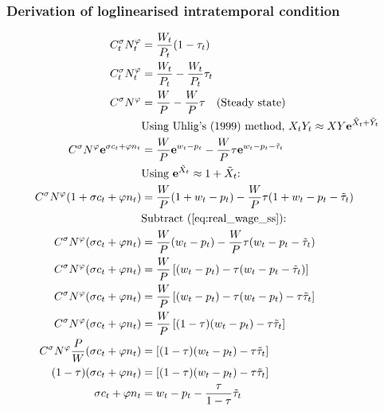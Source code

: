 \subsubsection{Derivation of loglinearised intratemporal condition}
\begin{align}
    C_t^\sigma N_t^\varphi &= \frac{W_t}{P_t}(1-\tau_t) \\
    C_t^\sigma N_t^\varphi &= \frac{W_t}{P_t} - \frac{W_t}{P_t}\tau_t \\
    C^\sigma N^\varphi &= \frac{W}{P} - \frac{W}{P}\tau \label{eq:real_wage_ss} \quad \text{(Steady state)}\\
    &\text{Using Uhlig's (1999) method, $X_tY_t \approx XY\mathbf{e}^{\tilde{X}_t + \tilde{Y}_t}$}\nonumber\\
    C^\sigma N^\varphi\mathbf{e}^{\sigma c_t + \varphi n_t} &= \frac{W}{P}\mathbf{e}^{w_t - p_t} - \frac{W}{P}\tau \mathbf{e}^{w_t - p_t - \tilde{\tau}_t}\\
    &\text{Using $\mathbf{e}^{\tilde{X}_t} \approx 1 + {\tilde{X}_t}$: }\nonumber\\
    C^\sigma N^\varphi({1+\sigma c_t + \varphi n_t}) &= \frac{W}{P}({1+ w_t - p_t}) - \frac{W}{P}\tau ({1+ w_t - p_t - \tilde{\tau}_t})\\
    &\text{Subtract (\ref{eq:real_wage_ss}): } \nonumber\\
    C^\sigma N^\varphi({\sigma c_t + \varphi n_t}) &= \frac{W}{P}({w_t - p_t}) - \frac{W}{P}\tau ({w_t - p_t - \tilde{\tau}_t})\\
    C^\sigma N^\varphi({\sigma c_t + \varphi n_t}) &= \frac{W}{P}\left[({w_t - p_t}) - \tau ({w_t - p_t - \tilde{\tau}_t})\right]\\
    C^\sigma N^\varphi({\sigma c_t + \varphi n_t}) &= \frac{W}{P}\left[({w_t - p_t}) - \tau ({w_t - p_t}) - \tau \tilde{\tau}_t\right]\\
    C^\sigma N^\varphi({\sigma c_t + \varphi n_t}) &= \frac{W}{P}\left[(1-\tau)({w_t - p_t}) - \tau \tilde{\tau}_t\right]\\
    C^\sigma N^\varphi \frac{P}{W} ({\sigma c_t + \varphi n_t})  &= \left[(1-\tau)({w_t - p_t}) - \tau \tilde{\tau}_t\right]\\
    (1-\tau)({\sigma c_t + \varphi n_t})  &= \left[(1-\tau)({w_t - p_t}) - \tau \tilde{\tau}_t\right]  \label{eq:intratemporal_loglinear_final_step} \\
    {\sigma c_t + \varphi n_t}  &= {w_t - p_t} - \frac{\tau}{1-\tau}\tilde{\tau}_t
\end{align}
\newpage